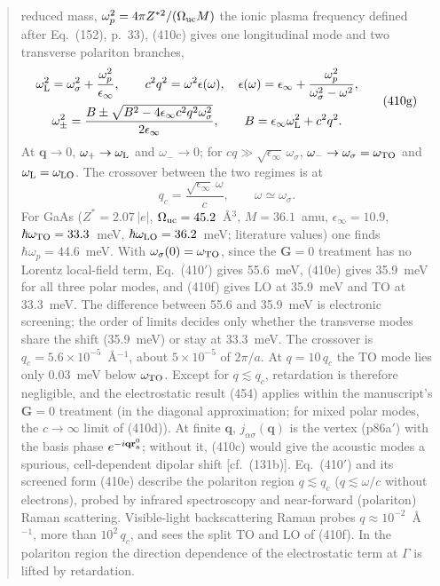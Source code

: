 \documentclass[11pt]{article}
\begin{document}
\begin{quote}
reduced mass, $\omega_p^2=4\pi Z^{*2}/(\Omega_{\rm uc}M)$ the ionic plasma frequency defined after
Eq.~(152), p.~33), (410c) gives one longitudinal mode and two transverse polariton branches,
\begin{equation*}
\begin{gathered}
\omega^2_{\rm L}=\omega^2_\sigma+\frac{\omega_p^2}{\epsilon_\infty},\qquad
c^2q^2=\omega^2\epsilon(\omega),\quad \epsilon(\omega)=\epsilon_\infty+\frac{\omega_p^2}{\omega^2_\sigma-\omega^2},\\
\omega^2_\pm=\frac{B\pm\sqrt{B^2-4\epsilon_\infty c^2q^2\omega^2_\sigma}}{2\epsilon_\infty},\qquad
B=\epsilon_\infty\omega^2_{\rm L}+c^2q^2 .
\end{gathered}
\tag{410g}
\end{equation*}
At $\mathbf q\to0$, $\omega_+\to\omega_{\rm L}$ and $\omega_-\to0$; for $cq\gg\sqrt{\epsilon_\infty}\,\omega_\sigma$,
$\omega_-\to\omega_\sigma=\omega_{\rm TO}$ and $\omega_{\rm L}=\omega_{\rm LO}$. The crossover between the two
regimes is at
\begin{equation*}
q_c=\frac{\sqrt{\epsilon_\infty}\,\omega}{c},\qquad \omega\simeq\omega_\sigma .
\tag{410h}
\end{equation*}
For GaAs ($Z^*=2.07\,|e|$, $\Omega_{\rm uc}=45.2$~\AA$^3$, $M=36.1$~amu, $\epsilon_\infty=10.9$,
$\hbar\omega_{\rm TO}=33.3$~meV, $\hbar\omega_{\rm LO}=36.2$~meV; literature values) one finds
$\hbar\omega_p=44.6$~meV. With $\omega_\sigma(0)=\omega_{\rm TO}$, since the $\mathbf G=0$ treatment has no
Lorentz local-field term, Eq.~(410$'$) gives 55.6~meV, (410e) gives 35.9~meV for all three polar modes,
and (410f) gives LO at 35.9~meV and TO at 33.3~meV. The difference between 55.6 and 35.9~meV is
electronic screening; the order of limits decides only whether the transverse modes share the shift
(35.9~meV) or stay at 33.3~meV. The crossover is $q_c=5.6\times10^{-5}$~\AA$^{-1}$, about
$5\times10^{-5}$ of $2\pi/a$. At $q=10\,q_c$ the TO mode lies only 0.03~meV below $\omega_{\rm TO}$. Except
for $q\lesssim q_c$, retardation is therefore negligible, and the electrostatic result (454) applies within
the manuscript's $\mathbf G=0$ treatment (in the diagonal approximation; for mixed polar modes, the
$c\to\infty$ limit of (410d)). At finite $\mathbf q$, $j_{\alpha\sigma}(\mathbf q)$ is the vertex (p86a$'$) with
the basis phase $e^{-i\mathbf q\mathbf r^0_{\rm a}}$; without it, (410c) would give the acoustic modes a
spurious, cell-dependent dipolar shift [cf.\ (131b)]. Eq.~(410$'$) and its screened form (410e) describe
the polariton region $q\lesssim q_c$ ($q\lesssim\omega/c$ without electrons), probed by infrared
spectroscopy and near-forward (polariton) Raman scattering. Visible-light backscattering Raman probes
$q\approx10^{-2}$~\AA$^{-1}$, more than $10^2\,q_c$, and sees the split TO and LO of (410f). In the
polariton region the direction dependence of the electrostatic term at $\Gamma$ is lifted by
retardation.
\end{quote}
\end{document}
